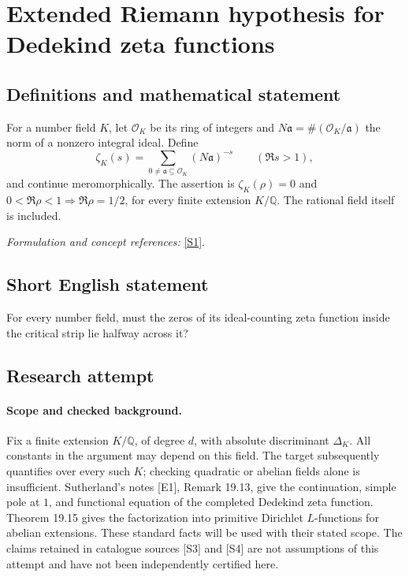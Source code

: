 \documentclass[11pt]{article}
\begin{document}
\section*{\texorpdfstring{Extended Riemann hypothesis for Dedekind zeta functions}{Extended Riemann hypothesis for Dedekind zeta functions}}\label{30006677}
\subsection{Definitions and mathematical statement}
For a number field $K$, let $\mathcal O_K$ be its ring of integers and $N\mathfrak a=\#(\mathcal O_K/\mathfrak a)$ the norm of a nonzero integral ideal. Define
\[
 \zeta_K(s)=\sum_{0\ne\mathfrak a\subseteq\mathcal O_K}(N\mathfrak a)^{-s}
 \qquad(\Re s>1),
\]
and continue meromorphically. The assertion is $\zeta_K(\rho)=0$ and $0<\Re\rho<1\Rightarrow\Re\rho=1/2$, for every finite extension $K/{\mathbb{Q}}$. The rational field itself is included.
\par\smallskip\textit{Formulation and concept references:} \href{https://www.aimath.org/WWN/rh/articles/html/18a/}{[S1]}.

\subsection{Short English statement}
For every number field, must the zeros of its ideal-counting zeta function inside the critical strip lie halfway across it?
\subsection{Research attempt}

\paragraph{Scope and checked background.}
Fix a finite extension $K/\mathbb Q$, of degree $d$, with absolute
discriminant $\Delta_K$. All constants in the argument may depend on this
field. The target subsequently quantifies over every such $K$; checking
quadratic or abelian fields alone is insufficient. Sutherland's notes
[E1], Remark 19.13, give the continuation, simple pole at $1$, and
functional equation of the completed Dedekind zeta function. Theorem 19.15
gives the factorization into primitive Dirichlet $L$-functions for abelian
extensions. These standard facts will be used with their stated scope.
The claims retained in catalogue sources [S3] and [S4] are not assumptions
of this attempt and have not been independently certified here.
\end{document}
